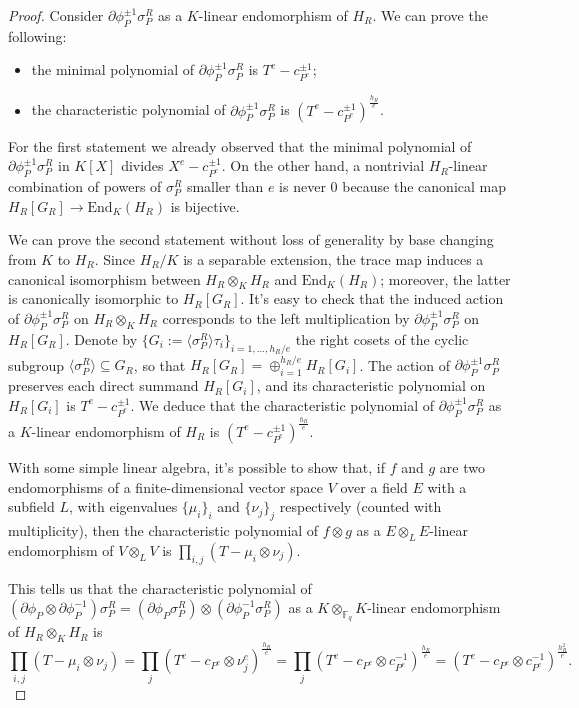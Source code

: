 \documentclass[11pt]{amsart}
\numberwithin{equation}{section}
\newcommand{\FF}{\mathbb{F}}
\begin{document}
\begin{proof}
Consider $\partial\phi_P^{\pm1}\sigma^R_P$ as a $K$-linear endomorphism of $H_R$. We can prove the following:
\begin{itemize}
    \item the minimal polynomial of $\partial\phi_P^{\pm1}\sigma^R_P$ is $T^e-c_{P^e}^{\pm1}$;
    \item the characteristic polynomial of $\partial\phi_P^{\pm1}\sigma^R_P$ is $(T^e-c_{P^e}^{\pm1})^\frac{h_R}{e}$.
\end{itemize}

For the first statement we already observed that the minimal polynomial of $\partial\phi_P^{\pm1}\sigma^R_P$ in $K[X]$ divides $X^e-c_{P^e}^{\pm1}$. On the other hand, a nontrivial $H_R$-linear combination of powers of $\sigma^R_P$ smaller than $e$ is never $0$ because the canonical map $H_R[G_R]\to\mathrm{End}_K(H_R)$ is bijective. 

We can prove the second statement without loss of generality by base changing from $K$ to $H_R$. Since $H_R/K$ is a separable extension, the trace map induces a canonical isomorphism between $H_R\otimes_K H_R$ and $\mathrm{End}_K(H_R)$; moreover, the latter is canonically isomorphic to $H_R[G_R]$. It's easy to check that the induced action of $\partial\phi_P^{\pm1}\sigma^R_P$ on $H_R\otimes_K H_R$ corresponds to the left multiplication by $\partial\phi_P^{\pm1}\sigma^R_P$ on $H_R[G_R]$. Denote by $\{G_i:=\langle\sigma^R_P\rangle\tau_i\}_{i=1,\dots,h_R/e}$ the right cosets of the cyclic subgroup $\langle\sigma^R_P\rangle\subseteq G_R$, so that $H_R[G_R]=\oplus_{i=1}^{h_R/e}H_R[G_i]$. The action of $\partial\phi_P^{\pm1}\sigma^R_P$ preserves each direct summand $H_R[G_i]$, and its characteristic polynomial on $H_R[G_i]$ is $T^e-c_{P^e}^{\pm1}$. We deduce that the characteristic polynomial of $\partial\phi_P^{\pm1}\sigma^R_P$ as a $K$-linear endomorphism of $H_R$ is $(T^e-c_{P^e}^{\pm1})^\frac{h_R}{e}$.

With some simple linear algebra, it's possible to show that, if $f$ and $g$ are two endomorphisms of a finite-dimensional vector space $V$ over a field $E$ with a subfield $L$, with eigenvalues $\{\mu_i\}_i$ and $\{\nu_j\}_j$ respectively (counted with multiplicity), then the characteristic polynomial of $f\otimes g$ as a $E\otimes_L E$-linear endomorphism of $V\otimes_L V$ is $\prod_{i,j}(T-\mu_i\otimes\nu_j)$.

This tells us that the characteristic polynomial of $(\partial\phi_P\otimes\partial\phi_P^{-1})\sigma^R_P=(\partial\phi_P\sigma^R_P)\otimes(\partial\phi_P^{-1}\sigma^R_P)$ as a $K\otimes_{\FF_q}K$-linear endomorphism of $H_R\otimes_K H_R$ is 
\[\prod_{i,j}(T-\mu_i\otimes\nu_j)=\prod_j(T^e-c_{P^e}\otimes\nu_j^e)^\frac{h_R}{e}=\prod_j(T^e-c_{P^e}\otimes c_{P^e}^{-1})^\frac{h_R}{e}=(T^e-c_{P^e}\otimes c_{P^e}^{-1})^\frac{h_R^2}{e}.\]
\end{proof}
\end{document}
